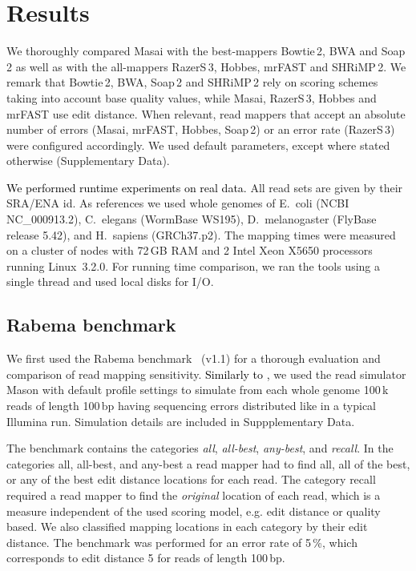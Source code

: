 \documentclass[a4,center,fleqn]{article}
\newcommand{\eg}{{e.g.}\xspace}
\begin{document}
\section{Results}

We thoroughly compared Masai with the best-mappers Bowtie\,2, BWA and Soap\,2 as well as with the all-mappers RazerS\,3, Hobbes, mrFAST and SHRiMP\,2.
We remark that Bowtie\,2, BWA, Soap\,2 and SHRiMP\,2 rely on scoring schemes taking into account base quality values, while Masai, RazerS\,3, Hobbes and mrFAST use edit distance.
When relevant, read mappers that accept an absolute number of errors (Masai, mrFAST, Hobbes, Soap\,2) or an error rate (RazerS\,3) were configured accordingly.
We used default parameters, except where stated otherwise (Supplementary Data).

\textcolor{black}{We performed runtime experiments on real data.}
All read sets are given by their SRA/ENA id.
As references we used whole genomes of E.~coli (NCBI NC\_000913.2), C.~elegans (WormBase WS195), D.~melanogaster (FlyBase release 5.42), and H.~sapiens (GRCh37.p2).
The mapping times were measured on a cluster of nodes with 72\,GB RAM and 2 Intel Xeon X5650 processors running Linux~3.2.0.
For running time comparison, we ran the tools using a single thread and used local disks for I/O.

\subsection{Rabema benchmark}

We first used the Rabema benchmark~\cite{Holtgrewe2011} (v1.1) for a thorough evaluation and comparison of read mapping sensitivity.
\textcolor{black}{Similarly to \cite{Bowtie2}, }we used the read simulator Mason \cite{SeqAnReadSimulator} with default profile settings to simulate from each whole genome 100\,k reads of length 100\,bp having sequencing errors distributed like in a typical Illumina run.
Simulation details are included in Suppplementary Data.

The benchmark contains the categories \emph{all}, \emph{all-best}, \emph{any-best}, and \emph{recall}.
In the categories all, all-best, and any-best a read mapper had to find all, all of the best, or any of the best edit distance locations for each read.
The category recall required a read mapper to find the \emph{original} location of each read, which is a measure independent of the used scoring model, \eg edit distance or quality based.
We also classified mapping locations in each category by their edit distance.
The benchmark was performed for an error rate of 5\,\%, which corresponds to edit distance 5 for reads of length 100\,bp.
\end{document}
